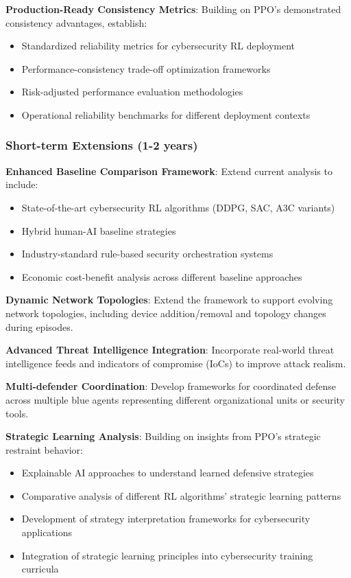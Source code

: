 \documentclass[12pt]{article}
\theoremstyle{definition}
\theoremstyle{plain}
\begin{document}
\textbf{Production-Ready Consistency Metrics}: Building on PPO's demonstrated consistency advantages, establish:
\begin{itemize}
\item Standardized reliability metrics for cybersecurity RL deployment
\item Performance-consistency trade-off optimization frameworks
\item Risk-adjusted performance evaluation methodologies
\item Operational reliability benchmarks for different deployment contexts
\end{itemize}

\subsubsection{Short-term Extensions (1-2 years)}

\textbf{Enhanced Baseline Comparison Framework}: Extend current analysis to include:
\begin{itemize}
\item State-of-the-art cybersecurity RL algorithms (DDPG, SAC, A3C variants)
\item Hybrid human-AI baseline strategies
\item Industry-standard rule-based security orchestration systems
\item Economic cost-benefit analysis across different baseline approaches
\end{itemize}

\textbf{Dynamic Network Topologies}: Extend the framework to support evolving network topologies, including device addition/removal and topology changes during episodes.

\textbf{Advanced Threat Intelligence Integration}: Incorporate real-world threat intelligence feeds and indicators of compromise (IoCs) to improve attack realism.

\textbf{Multi-defender Coordination}: Develop frameworks for coordinated defense across multiple blue agents representing different organizational units or security tools.

\textbf{Strategic Learning Analysis}: Building on insights from PPO's strategic restraint behavior:
\begin{itemize}
\item Explainable AI approaches to understand learned defensive strategies
\item Comparative analysis of different RL algorithms' strategic learning patterns
\item Development of strategy interpretation frameworks for cybersecurity applications
\item Integration of strategic learning principles into cybersecurity training curricula
\end{itemize}
\end{document}
